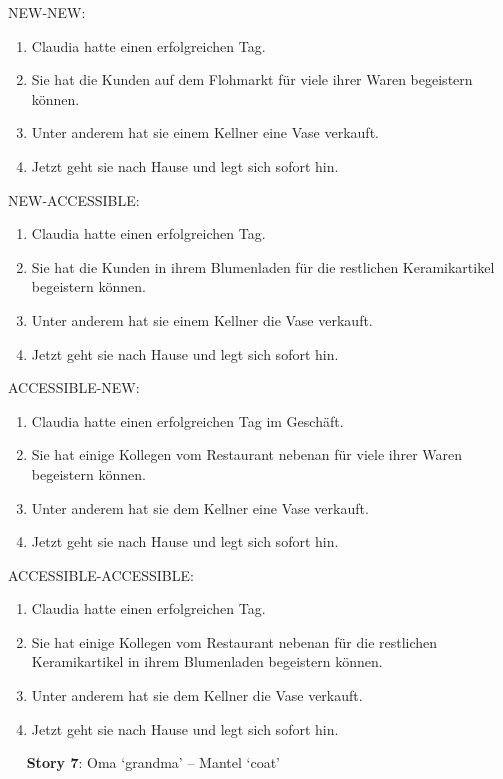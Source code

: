 NEW-NEW:

\begin{enumerate}
\item Claudia hatte einen erfolgreichen Tag.
\item Sie hat die Kunden auf dem Flohmarkt für viele ihrer Waren begeistern können.
\item Unter anderem hat sie einem Kellner eine Vase verkauft.
\item Jetzt geht sie nach Hause und legt sich sofort hin.
\end{enumerate}

NEW-ACCESSIBLE:

\begin{enumerate}
\item Claudia hatte einen erfolgreichen Tag.
\item Sie hat die Kunden in ihrem Blumenladen für die restlichen Keramikartikel begeistern können. 
\item Unter anderem hat sie einem Kellner die Vase verkauft.
\item Jetzt geht sie nach Hause und legt sich sofort hin.
\end{enumerate}

ACCESSIBLE-NEW:

\begin{enumerate}
\item Claudia hatte einen erfolgreichen Tag im Geschäft.
\item Sie hat einige Kollegen vom Restaurant nebenan für viele ihrer Waren begeistern können.
\item Unter anderem hat sie dem Kellner eine Vase verkauft.
\item Jetzt geht sie nach Hause und legt sich sofort hin.
\end{enumerate}

ACCESSIBLE-ACCESSIBLE:

\begin{enumerate}
\item Claudia hatte einen erfolgreichen Tag.
\item Sie hat einige Kollegen vom Restaurant nebenan für die restlichen Keramikartikel in ihrem Blumenladen begeistern können.
\item Unter anderem hat sie dem Kellner die Vase verkauft.
\item Jetzt geht sie nach Hause und legt sich sofort hin.
\end{enumerate}
 
\textbf{Story 7}: Oma `grandma' – Mantel `coat'\\

